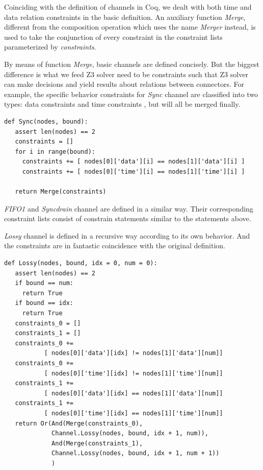 \documentclass{llncs}
\begin{document}
Coinciding with the definition of channels in Coq, we dealt with both time and data relation constraints in the basic definition. An auxiliary function \emph{Merge}, different from the composition operation which uses the name \emph{Merger} instead, is used to take the conjunction of every constraint in the constraint lists parameterized by \emph{constraints}.

By means of function \emph{Merge}, basic channels are defined concisely. But the biggest difference is what we feed Z3 solver need to be constraints such that Z3 solver can make decisions and yield results about relations between connectors. For example, the specific behavior constraints for \emph{Sync} channel are classified into two types: data constraints and time constraints , but will all be merged finally.

\begin{verbatim}
def Sync(nodes, bound):
   assert len(nodes) == 2
   constraints = []
   for i in range(bound):
     constraints += [ nodes[0]['data'][i] == nodes[1]['data'][i] ]
     constraints += [ nodes[0]['time'][i] == nodes[1]['time'][i] ]

   return Merge(constraints)
\end{verbatim}

\emph{FIFO1} and \emph{Syncdrain} channel are defined in a similar way. Their corresponding constraint lists consist of constrain statements similar to the statements above.

\emph{Lossy} channel is defined in a recursive way according to its own behavior. And the constraints are in fantastic coincidence with the original definition.
\begin{verbatim}
def Lossy(nodes, bound, idx = 0, num = 0):
   assert len(nodes) == 2
   if bound == num:
     return True
   if bound == idx:
     return True
   constraints_0 = []
   constraints_1 = []
   constraints_0 +=
           [ nodes[0]['data'][idx] != nodes[1]['data'][num]]
   constraints_0 +=
           [ nodes[0]['time'][idx] != nodes[1]['time'][num]]
   constraints_1 +=
           [ nodes[0]['data'][idx] == nodes[1]['data'][num]]
   constraints_1 +=
           [ nodes[0]['time'][idx] == nodes[1]['time'][num]]
   return Or(And(Merge(constraints_0),
             Channel.Lossy(nodes, bound, idx + 1, num)),
             And(Merge(constraints_1),
             Channel.Lossy(nodes, bound, idx + 1, num + 1))
             )
\end{verbatim}
\end{document}
